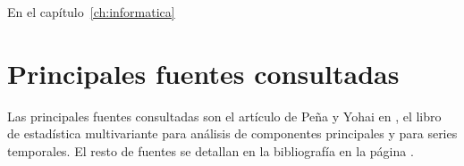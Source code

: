 En el capítulo~\ref{ch:informatica} %


\section{Principales fuentes consultadas}
Las principales fuentes consultadas son el artículo de Peña y Yohai en \cite{pena16}, el libro de estadística multivariante \cite{anderson} para análisis de componentes principales y \cite{pena05} para series temporales. El resto de fuentes se detallan en la bibliografía en la página \pageref{bibliography}.


%